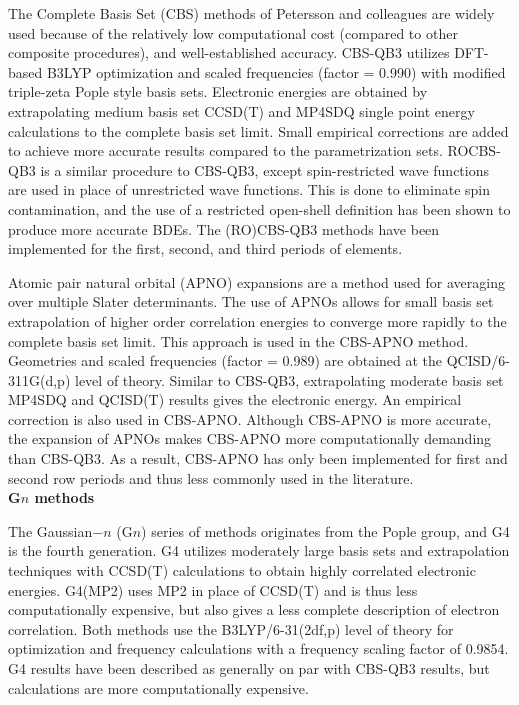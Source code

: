 The Complete Basis Set (CBS) methods of Petersson and
colleagues\cite{Montgomery1999, Montgomery2000, Ochterski1996, Wood2006} are
widely used because of the relatively low computational cost (compared to other
composite procedures), and well-established accuracy.\cite{Somers2015,
Simmie2015} CBS-QB3\cite{Montgomery1999, Montgomery2000} utilizes DFT-based
B3LYP optimization and scaled frequencies (factor = 0.990) with modified
triple-zeta Pople style basis sets. Electronic energies are obtained by
extrapolating medium basis set CCSD(T) and MP4SDQ single point energy
calculations to the complete basis set limit. Small empirical corrections are
added to achieve more accurate results compared to the parametrization
sets.\cite{Petersson2001} ROCBS-QB3 is a similar procedure to CBS-QB3, except
spin-restricted wave functions are used in place of unrestricted wave
functions. This is done to eliminate spin contamination, and the use of a
restricted open-shell definition has been shown to produce more accurate
BDEs.\cite{DiLabio1999} The (RO)CBS-QB3 methods have been implemented for the
first, second, and third periods of elements.

Atomic pair natural orbital (APNO) expansions are a method used for averaging
over multiple Slater determinants. The use of APNOs allows for small basis set
extrapolation of higher order correlation energies to converge more rapidly to
the complete basis set limit. This approach is used in the CBS-APNO
method.\cite{Ochterski1996} Geometries and scaled frequencies (factor = 0.989)
are obtained at the QCISD/6-311G(d,p) level of theory. Similar to CBS-QB3,
extrapolating moderate basis set MP4SDQ and QCISD(T) results gives the
electronic energy. An empirical correction is also used in CBS-APNO. Although
CBS-APNO is more accurate, the expansion of APNOs makes CBS-APNO more
computationally demanding than CBS-QB3. As a result, CBS-APNO has only been
implemented for first and second row periods and thus less commonly used in the
literature.  \\

\noindent \textbf{G$n$ methods}

The Gaussian$-n$ (G$n$) series of methods originates from the Pople
group,\cite{Pople1989} and G4 is the fourth generation. G4 utilizes moderately
large basis sets and extrapolation techniques with CCSD(T) calculations to
obtain highly correlated electronic energies. G4(MP2) uses MP2 in place of
CCSD(T) and is thus less computationally expensive, but also gives a less
complete description of electron correlation. Both methods use the
B3LYP/6-31(2df,p) level of theory for optimization and frequency calculations
with a frequency scaling factor of 0.9854. G4 results have been described as
generally on par with CBS-QB3 results,\cite{Somers2015, Simmie2015} but
calculations are more computationally expensive.

